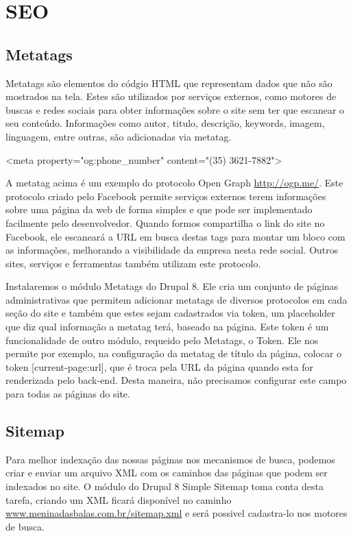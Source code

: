 \documentclass[
	12pt,				%
    oneside,			%
	a4paper,			%
	english,			%
	french,				%
	spanish,			%
	brazil				%
	]{abntex2}
\begin{document}
\section{SEO}

\subsection{Metatags}
Metatags são elementos do códgio HTML que representam dados que não são mostrados na tela. Estes são utilizados por serviços externos, como motores de buscas e redes sociais para obter informações sobre o site sem ter que escanear o seu conteúdo. Informações como autor, titulo, descrição, keywords, imagem, linguagem, entre outras, são adicionadas via metatag.

\begin{center}
  <meta property="og:phone_number" content="(35) 3621-7882">
\end{center}

A metatag acima é um exemplo do protocolo Open Graph \url{http://ogp.me/}. Este protocolo criado pelo Facebook permite serviços externos terem informações sobre uma página da web de forma simples e que pode ser implementado facilmente pelo desenvolvedor. Quando formos compartilha o link do site no Facebook, ele escaneará a URL em busca destas tags para montar um bloco com as informações, melhorando a visibilidade da empresa nesta rede social. Outros sites, serviços e ferramentas também utilizam este protocolo.

Instalaremos o módulo Metatags do Drupal 8. Ele cria um conjunto de páginas administrativas  que permitem adicionar metatags de diversos protocolos em cada seção do site e também que estes sejam cadastrados via token, um placeholder que diz qual informação a metatag terá, baseado na página. Este token é um funcionalidade de outro módulo, requeido pelo Metatags, o Token. Ele nos permite por exemplo, na configuração da metatag de título da página, colocar o token [current-page:url], que é troca pela URL da página quando esta for renderizada pelo back-end. Desta maneira, não precisamos configurar este campo para todas as páginas do site.

\subsection{Sitemap}
Para melhor indexação das nossas páginas nos mecanismos de busca, podemos criar e enviar um arquivo XML com os caminhos das páginas que podem ser indexados no site. O módulo do Drupal 8 Simple Sitemap toma conta desta tarefa, criando um XML ficará disponível no caminho \url{www.meninadasbalas.com.br/sitemap.xml} e será possivel cadastra-lo nos motores de busca.
\end{document}
